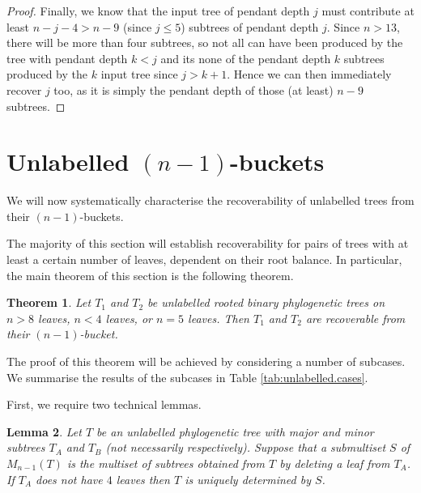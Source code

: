 \documentclass[12pt]{article}
\newtheorem{Theorem}{Theorem}[section]
\newtheorem{Lemma}[Theorem]{Lemma}
\theoremstyle{definition}
\begin{document}
\begin{proof}
    Finally, we know that the input tree of pendant depth $j$ must contribute at least $n-j-4>n-9$ (since $j \le 5$) subtrees of pendant depth $j$. Since $n>13$, there will be more than four subtrees, so not all can have been produced by the tree with pendant depth $k<j$ and its none of the pendant depth $k$ subtrees produced by the $k$ input tree since $j>k+1$. Hence we can then immediately recover $j$ too, as it is simply the pendant depth of those (at least) $n-9$ subtrees.
\end{proof}

\section{Unlabelled \texorpdfstring{$(n-1)$}{(n-1)}-buckets}\label{s:unlabelledn-1}

We will now systematically characterise the recoverability of unlabelled trees from their $(n-1)$-buckets. 

The majority of this section will establish recoverability for pairs of trees with at least a certain number of leaves, dependent on their root balance. In particular, the main theorem of this section is the following theorem.

\begin{Theorem}
    \label{always_recoverable_unlabelled}
    Let $T_1$ and $T_2$ be unlabelled  rooted binary phylogenetic trees on $n>8$ leaves, $n<4$ leaves, or $n=5$ leaves. Then $T_1$ and $T_2$ are recoverable from their $(n-1)$-bucket.
\end{Theorem}

The proof of this theorem will be achieved by considering a number of subcases. We summarise the results of the subcases in Table \ref{tab:unlabelled.cases}.

First, we require two technical lemmas.

\begin{Lemma}\label{recover_from_root_balance_class}
    Let $T$ be an unlabelled phylogenetic tree with major and minor subtrees $T_A$ and $T_B$ (not necessarily respectively). Suppose that a submultiset $S$ of $M_{n-1}(T)$ is the multiset of subtrees obtained from $T$ by deleting a leaf from $T_A$. If $T_A$ does not have $4$ leaves then $T$ is uniquely determined by $S$.
\end{Lemma}
\end{document}
